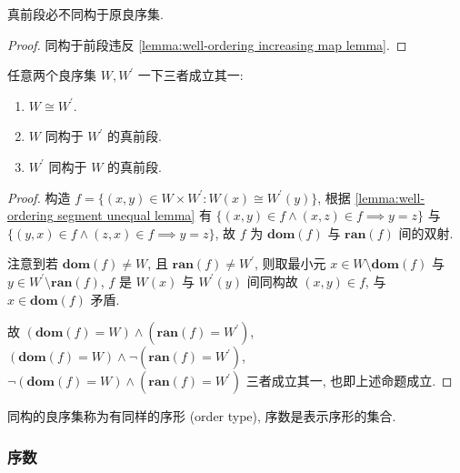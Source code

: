 \begin{lemma}
    \label{lemma:well-ordering segment unequal lemma}
    真前段必不同构于原良序集.

    \begin{proof}
        同构于前段违反 \ref{lemma:well-ordering increasing map lemma}.
    \end{proof}
\end{lemma}

\begin{theorem}
    \label{theorem:well-ordering segment equal theorem}
    任意两个良序集 \(W, W^\prime\) 一下三者成立其一:
    \begin{enumerate}
        \item \(W \cong W^\prime\).
        \item \(W\) 同构于 \(W^\prime\) 的真前段.
        \item \(W^\prime\) 同构于 \(W\) 的真前段.
    \end{enumerate}

    \begin{proof}
        构造 \(f = \{(x,y) \in W \times W^\prime : W(x) \cong W^\prime(y)\}\),
        根据 \ref{lemma:well-ordering segment unequal lemma} 有 \(\{(x,y) \in f \land (x,z) \in f \implies y = z\}\) 与
        \(\{(y,x) \in f \land (z,x) \in f \implies y=z\}\), 
        故 \(f\) 为 \(\mathbf{dom} (f)\) 与 \(\mathbf{ran} (f)\) 间的双射.

        注意到若 \(\mathbf{dom} (f) \neq W\), 且 \(\mathbf{ran} (f) \neq W^\prime\),
        则取最小元 \(x \in W \setminus \mathbf{dom} (f)\) 与 \(y \in W^\prime \setminus \mathbf{ran} (f)\),
        \(f\) 是 \(W(x)\) 与 \(W^\prime(y)\) 间同构故 \((x,y) \in f\), 与 \(x \in \mathbf{dom} (f)\) 矛盾.

        故 \((\mathbf{dom} (f) = W) \land (\mathbf{ran} (f) = W^\prime)\), \((\mathbf{dom} (f) = W) \land \neg(\mathbf{ran} (f) = W^\prime)\), 
        \(\neg(\mathbf{dom} (f) = W) \land (\mathbf{ran} (f) = W^\prime)\) 三者成立其一, 也即上述命题成立.
    \end{proof}
\end{theorem}

\begin{definition}
    同构的良序集称为有同样的序形 (order type), 序数是表示序形的集合.
\end{definition}

\subsubsection{序数}

